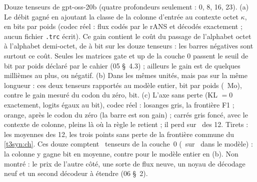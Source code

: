  {Douze tenseurs de gpt-oss-20b (quatre profondeurs seulement : 0, 8, 16, 23). (a) Le débit gagné en ajoutant
   la classe de la colonne d'entrée au contexte octet $\kappa$, en bits par poids (codec réel : flux codés par le
   rANS et décodés exactement ; aucun fichier \texttt{.trc} écrit). Ce gain contient le coût du passage de
   l'alphabet octet à l'alphabet demi-octet, de \CodonNum{\CodonNColonneAlphabetMin} à
   \CodonNum{\CodonNColonneAlphabetMax} bit sur les douze tenseurs : les barres négatives sont surtout ce coût. Seules les matrices gate et up de la couche 0 passent le seuil de
   \CodonNum{\CodonNColonneSeuil} bit par poids déclaré par le cahier (05 §~4.3) ; ailleurs le gain est de quelques
   millièmes au plus, ou négatif. (b) Dans les mêmes unités, mais pas sur la même longueur : ces deux tenseurs
   rapportés au modèle entier, \CodonNum{\CodonNColonneModele} bit par poids (\CodonNum{\CodonNColonneMo}~Mo), contre
   le gain mesuré du codon du zéro, \CodonNum{\CodonNZeroGain} bit. (c) L'axe sans perte (KL $=0$ exactement, logits
   égaux au bit), codec réel : losanges gris, la frontière F1 ; orange, après le codon du zéro (la barre est son
   gain) ; carrés gris foncé, avec le contexte de colonne, pleins là où la règle le retient ; il perd sur
   \CodonNSansPertePerd\ des 12. Tirets : les moyennes des 12, les trois points sans perte de la frontière commune
   du \cref{t3syn:ch}. Ces douze comptent \CodonNSansPerteCouchesZero\ tenseurs de la couche~0 (\CodonNSansPerteCouchesZero\ sur \CodonNRoueTenseurs\ dans le
   modèle) : la colonne y gagne \CodonNum{\CodonNSansPerteGainDouze} bit en moyenne, contre
   \CodonNum{\CodonNColonneModele} pour le modèle entier en (b). Non montré : le prix de
   l'autre côté, une sorte de flux neuve, un noyau de décodage neuf et un second décodeur à étendre (06 §~2).}

